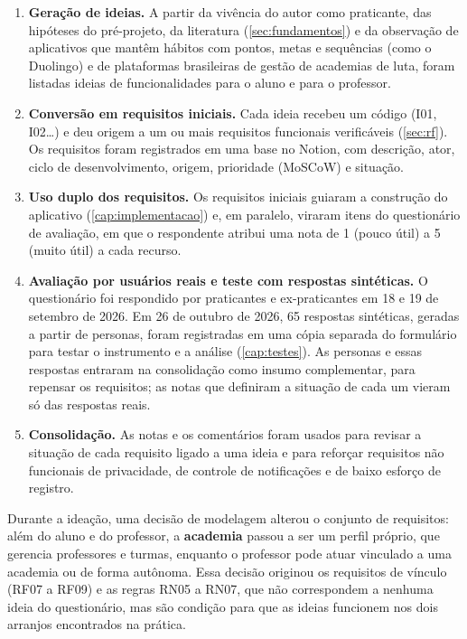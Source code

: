 \begin{enumerate}
  \item \textbf{Geração de ideias.} A partir da vivência do autor como
        praticante, das hipóteses do pré-projeto, da literatura
        (\autoref{sec:fundamentos}) e da observação de aplicativos que
        mantêm hábitos com pontos, metas e sequências (como o Duolingo) e
        de plataformas brasileiras de gestão de academias de luta, foram
        listadas ideias de funcionalidades para o aluno e para o
        professor.
  \item \textbf{Conversão em requisitos iniciais.} Cada ideia recebeu um
        código (I01, I02\ldots) e deu origem a um ou mais requisitos
        funcionais verificáveis (\autoref{sec:rf}). Os requisitos foram
        registrados em uma base no Notion, com descrição, ator, ciclo de
        desenvolvimento, origem, prioridade (MoSCoW) e situação.
  \item \textbf{Uso duplo dos requisitos.} Os requisitos iniciais
        guiaram a construção do aplicativo (\autoref{cap:implementacao}) e,
        em paralelo, viraram itens do questionário de avaliação, em que o
        respondente atribui uma nota de 1 (pouco útil) a 5 (muito útil) a
        cada recurso.
  \item \textbf{Avaliação por usuários reais e teste com respostas
        sintéticas.} O questionário foi respondido por praticantes e
        ex-praticantes em 18 e 19 de setembro de 2026. Em 26 de outubro
        de 2026, 65 respostas sintéticas, geradas a partir de personas,
        foram registradas em uma cópia separada do formulário para testar
        o instrumento e a análise (\autoref{cap:testes}). As personas e
        essas respostas entraram na consolidação como insumo
        complementar, para repensar os requisitos; as notas que definiram
        a situação de cada um vieram só das respostas reais.
  \item \textbf{Consolidação.} As notas e os comentários foram usados
        para revisar a situação de cada requisito ligado a uma ideia e
        para reforçar requisitos não funcionais de privacidade, de
        controle de notificações e de baixo esforço de registro.
\end{enumerate}

Durante a ideação, uma decisão de modelagem alterou o conjunto de
requisitos: além do aluno e do professor, a \textbf{academia} passou a ser
um perfil próprio, que gerencia professores e turmas, enquanto o professor
pode atuar vinculado a uma academia ou de forma autônoma. Essa decisão
originou os requisitos de vínculo (RF07 a RF09) e as regras RN05 a RN07,
que não correspondem a nenhuma ideia do questionário, mas são condição
para que as ideias funcionem nos dois arranjos encontrados na prática.

